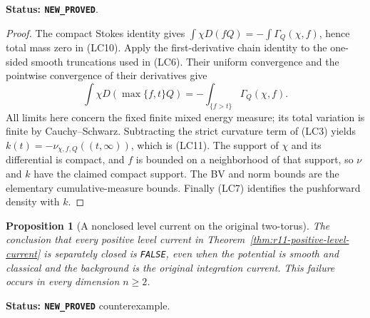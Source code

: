 \documentclass[11pt,a4paper]{article}
\numberwithin{equation}{section}
\newtheorem{proposition}[theorem]{Proposition}
\theoremstyle{definition}
\theoremstyle{remark}
\begin{document}
\noindent\textbf{Status: \texttt{NEW\_PROVED}}.

\begin{proof}
The compact Stokes identity gives
$\int\chi D(fQ)=-\int\Gamma_Q(\chi,f)$, hence total mass
zero in (LC10).  Apply the first-derivative chain identity to the
one-sided smooth truncations used in (LC6).  Their uniform
convergence and the pointwise convergence of their derivatives
give
\[
 \int\chi D(\max\{f,t\}Q)
       =-\int_{\{f>t\}}\Gamma_Q(\chi,f).
\]
All limits here concern the fixed finite mixed energy measure;
its total variation is finite by Cauchy--Schwarz.  Subtracting
the strict curvature term of (LC3) yields
$k(t)=-\nu_{\chi,f,Q}((t,\infty))$, which is (LC11).
The support of $\chi$ and its differential is compact, and
$f$ is bounded on a neighborhood of that support, so $\nu$
and $k$ have the claimed compact support.  The BV and norm
bounds are the elementary cumulative-measure bounds.  Finally
(LC7) identifies the pushforward density with $k$.
\end{proof}

\begin{proposition}[A nonclosed level current on the original two-torus]
\label{prop:r11-nonclosed-level-example}
The conclusion that every positive level current in
Theorem~\ref{thm:r11-positive-level-current} is separately closed is
\texttt{FALSE}, even when the potential is smooth and classical and
the background is the original integration current.  This failure
occurs in every dimension $n\geq2$.
\end{proposition}

\noindent\textbf{Status: \texttt{NEW\_PROVED}} counterexample.
\end{document}
